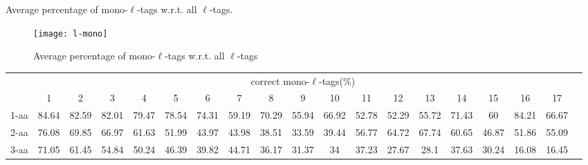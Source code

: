 \documentclass{article}[12pt]
\begin{document}
\begin{landscape}
\begin{table}[h]
\caption{ Average percentage of mono-$\ell$-tags w.r.t. all $\ell$-tags.}
\label{table:l-mono}

\vspace{3mm}
\end{table}
\end{landscape}

\begin{figure}
  \begin{center}
\texttt{[image: l-mono]}
\end{center}
\caption{Average percentage of mono-$\ell$-tags w.r.t. all $\ell$-tags}
  \label{fig:l-mono}
\end{figure}


\begin{landscape}

\begin{table}[h]\tiny
\vspace{3mm}
{\centering
\begin{center}
\begin{tabular}{|l|c|c|c|c|c|c|c|c|c|c|c|c|c|c|c|c|c|c|}
  \hline
  & \multicolumn{ 17 }{|c|}{correct mono-$\ell$-tags(\%)} \\
  \cline{2- 18}
    & 1 & 2 & 3 & 4 & 5 & 6 & 7 & 8 & 9 & 10 & 11 & 12 & 13 & 14 & 15 & 16 & 17\\
  \hline
1-aa  & 84.64 & 82.59 & 82.01 & 79.47 & 78.54 & 74.31 & 59.19 & 70.29 & 55.94 & 66.92 & 52.78 & 52.29 & 55.72 & 71.43 & 60 & 84.21 & 66.67\\
2-aa  & 76.08 & 69.85 & 66.97 & 61.63 & 51.99 & 43.97 & 43.98 & 38.51 & 33.59 & 39.44 & 56.77 & 64.72 & 67.74 & 60.65 & 46.87 & 51.86 & 55.09\\
3-aa  & 71.05 & 61.45 & 54.84 & 50.24 & 46.39 & 39.82 & 44.71 & 36.17 & 31.37 & 34 & 37.23 & 27.67 & 28.1 & 37.63 & 30.24 & 16.08 & 16.45\\
 \hline
\end{tabular}
\end{center}
\par}
\centering


\end{table}
\end{landscape}
\end{document}
